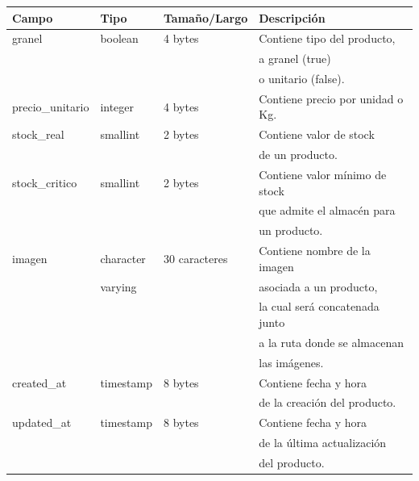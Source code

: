 \documentclass[letterpaper,12pt]{article}
\begin{document}
\begin{enumerate}
\begin{table}[!ht]
\begin{center}
\begin{tabular}{|l|l|l|l|}
\hline
\textbf{Campo} \hspace*{2cm} & \textbf{Tipo} & \textbf{Tamaño/Largo} & \textbf{Descripción} \hspace*{3,5cm} \\
\hline

granel & boolean & 4 bytes &Contiene tipo del producto,\\
\mbox{} & \mbox{} & &a granel (true)\\
\mbox{} & \mbox{} & &o unitario (false).\\
\hline


precio\_unitario & integer &4 bytes &Contiene precio por unidad o Kg.\\
\hline

stock\_real & smallint &2 bytes &Contiene valor de stock\\
\mbox{} & \mbox{} & &de un producto. \\
\hline

stock\_critico & smallint &2 bytes &Contiene valor mínimo de stock\\
\mbox{} & \mbox{} & &que admite el almacén para\\
\mbox{} & \mbox{} & &un producto. \\
\hline

imagen & character &30 caracteres &Contiene nombre de la imagen \\
\mbox{} & varying & &asociada a un producto,\\
\mbox{} & \mbox{} & &la cual será concatenada junto\\
\mbox{} & \mbox{} & &a la ruta donde se almacenan\\
\mbox{} & \mbox{} & &las imágenes.\\
\hline

created\_at& timestamp & 8 bytes &Contiene fecha y hora\\
\mbox{} & \mbox{} & &de la creación del producto.\\
\hline
updated\_at& timestamp & 8 bytes &Contiene fecha y hora \\
\mbox{} & \mbox{} & &de la última actualización\\
\mbox{} & \mbox{} & &del producto.\\
\hline

\end{tabular}
\end{center}
\end{table}



\end{enumerate}
\end{document}
